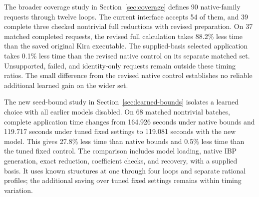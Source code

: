 \documentclass[11pt,a4paper]{article}
\begin{document}
The broader coverage study in Section~\ref{sec:coverage} defines 90 native-family requests through twelve loops. The current interface accepts 54 of them, and 39 complete three checked nontrivial full reductions with revised preparation. On 37 matched completed requests, the revised full calculation takes 88.2\% less time than the saved original Kira executable. The supplied-basis selected application takes 0.1\% less time than the revised native control on its separate matched set. Unsupported, failed, and identity-only requests remain outside these timing ratios. The small difference from the revised native control establishes no reliable additional learned gain on the wider set.








The new seed-bound study in Section~\ref{sec:learned-bounds} isolates a learned choice with all earlier models disabled. On 68 matched nontrivial batches, complete application time changes from 164.926 seconds under native bounds and 119.717 seconds under tuned fixed settings to 119.081 seconds with the new model. This gives 27.8\% less time than native bounds and 0.5\% less time than the tuned fixed control. The comparison includes model loading, native IBP generation, exact reduction, coefficient checks, and recovery, with a supplied basis. It uses known structures at one through four loops and separate rational profiles; the additional saving over tuned fixed settings remains within timing variation.
\clearpage
\renewcommand{\refname}{Citations}
\appendix
\renewcommand{\thesection}{A\arabic{section}}
\renewcommand{\theHsection}{appendix.\arabic{section}}



















\end{document}
